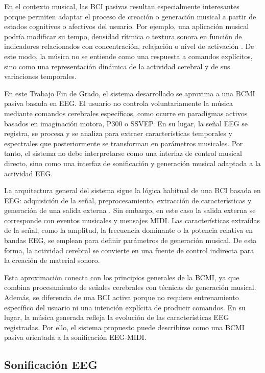 \documentclass[../main.tex]{subfiles}
\begin{document}
En el contexto musical, las BCI pasivas resultan especialmente interesantes porque permiten adaptar el proceso de creación o generación musical a partir de estados cognitivos o afectivos del usuario. Por ejemplo, una aplicación musical podría modificar su tempo, densidad rítmica o textura sonora en función de indicadores relacionados con concentración, relajación o nivel de activación \cite{GeorgeLecuyer2014PassiveBCI}. De este modo, la música no se entiende como una respuesta a comandos explícitos, sino como una representación dinámica de la actividad cerebral y de sus variaciones temporales.

En este Trabajo Fin de Grado, el sistema desarrollado se aproxima a una BCMI pasiva basada en EEG. El usuario no controla voluntariamente la música mediante comandos cerebrales específicos, como ocurre en paradigmas activos basados en imaginación motora, P300 o SSVEP. En su lugar, la señal EEG se registra, se procesa y se analiza para extraer características temporales y espectrales que posteriormente se transforman en parámetros musicales. Por tanto, el sistema no debe interpretarse como una interfaz de control musical directo, sino como una interfaz de sonificación y generación musical adaptada a la actividad EEG.

La arquitectura general del sistema sigue la lógica habitual de una BCI basada en EEG: adquisición de la señal, preprocesamiento, extracción de características y generación de una salida externa \cite{Palaniappan2014}. Sin embargo, en este caso la salida externa se corresponde con eventos musicales y mensajes MIDI. Las características extraídas de la señal, como la amplitud, la frecuencia dominante o la potencia relativa en bandas EEG, se emplean para definir parámetros de generación musical. De esta forma, la actividad cerebral se convierte en una fuente de control indirecta para la creación de material sonoro.

Esta aproximación conecta con los principios generales de la BCMI, ya que combina procesamiento de señales cerebrales con técnicas de generación musical. Además, se diferencia de una BCI activa porque no requiere entrenamiento específico del usuario ni una intención explícita de producir comandos. En su lugar, la música generada refleja la evolución de las características EEG registradas. Por ello, el sistema propuesto puede describirse como una BCMI pasiva orientada a la sonificación EEG-MIDI.

\subsection{Sonificación EEG}
\end{document}
